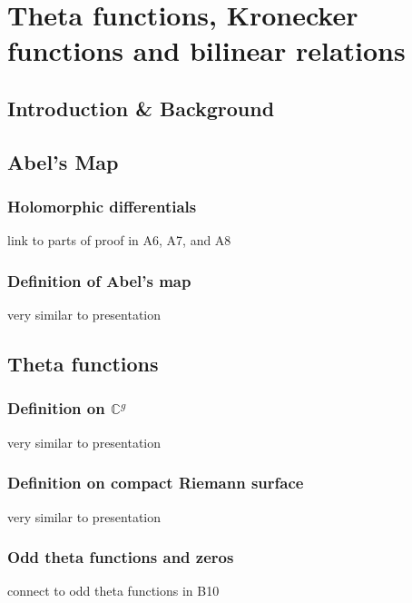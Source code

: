 


\chapter{Theta functions, Kronecker functions and bilinear relations}
\label{rep:B12}

\section{Introduction \& Background}

\section{Abel's Map}

\subsection{Holomorphic differentials}
link to parts of proof in A6, A7, and A8

\subsection{Definition of Abel's map}
very similar to presentation

\section{Theta functions}

\subsection{Definition on $\mathbb C^g$}
very similar to presentation

\subsection{Definition on compact Riemann surface}
very similar to presentation

\subsection{Odd theta functions and zeros}
connect to odd theta functions in B10

